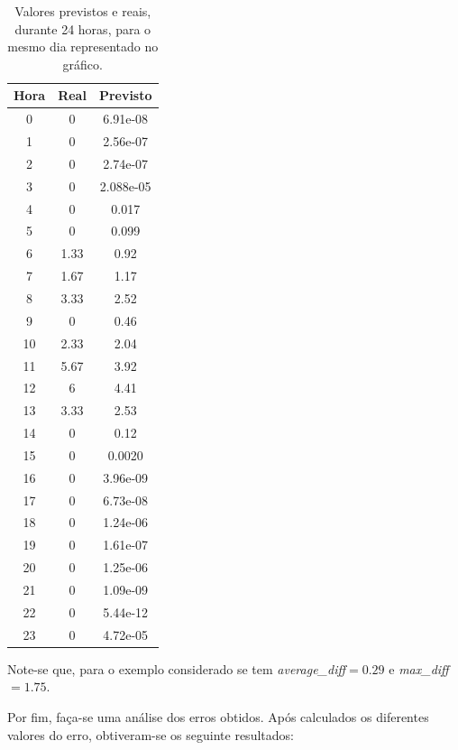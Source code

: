 \documentclass[a4paper, 12pt]{article}
\begin{document}
\begin{table}[H]
	\centering
	\begin{tabular}{||c||c|c||}
		\hline\hline
		Hora & Real&Previsto\\
		\hline\hline
		0 & 0 & 6.91e-08 \\
		\hline
		1  &0 & 2.56e-07\\
		\hline
		2 & 0 & 2.74e-07\\
		\hline
		3  & 0 &2.088e-05 \\
		\hline
		4 & 0 &0.017 \\
		\hline
		5  &0  &0.099 \\
		\hline
		6 & 1.33& 0.92 \\
		\hline
		7 & 1.67& 1.17\\
		\hline
		8  &3.33& 2.52\\
		\hline
		9 & 0 &  0.46\\
		\hline
		10 & 2.33 &  2.04 \\
		\hline
		11  &5.67 &3.92\\
		\hline
		12 & 6 &  4.41\\
		\hline
		13  & 3.33 & 2.53 \\
		\hline
		14 & 0  & 0.12\\
		\hline
		15  & 0 &0.0020 \\
		\hline
		16 & 0 & 3.96e-09 \\
		\hline
		17 & 0 & 6.73e-08 \\
		\hline
		18  &0 &1.24e-06 \\
		\hline
		19 &0  & 1.61e-07	\\
		\hline
		20 & 0 & 1.25e-06\\
		\hline
		21  &0 & 1.09e-09\\
		\hline
		22 & 0 & 5.44e-12	\\
		\hline
		23  & 0& 4.72e-05 \\
		\hline\hline
	\end{tabular}
\caption{Valores previstos e reais, durante 24 horas, para o mesmo dia representado no gráfico.}
\end{table} 

Note-se que, para o exemplo considerado se tem \textit{average\_diff}$=0.29$ e \textit{max\_diff}$=1.75$.

Por fim, faça-se uma análise dos erros obtidos. Após calculados os diferentes valores do erro, obtiveram-se os seguinte resultados:
\end{document}
